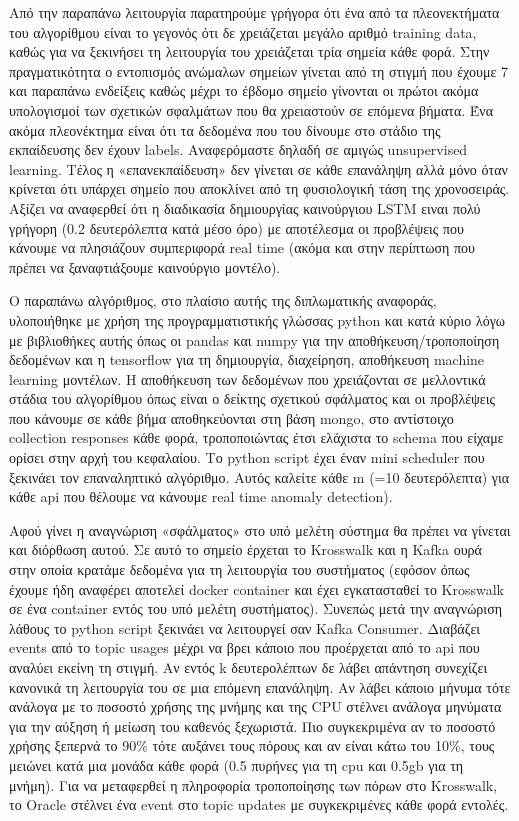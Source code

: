 Από την παραπάνω λειτουργία παρατηρούμε γρήγορα ότι ένα από τα πλεονεκτήματα του αλγορίθμου είναι το γεγονός ότι δε χρειάζεται μεγάλο αριθμό training data, καθώς για να ξεκινήσει τη λειτουργία του χρειάζεται τρία σημεία κάθε φορά. Στην πραγματικότητα ο εντοπισμός ανώμαλων σημείων γίνεται από τη στιγμή που έχουμε 7 και παραπάνω ενδείξεις καθώς μέχρι το έβδομο σημείο γίνονται οι πρώτοι ακόμα υπολογισμοί των σχετικών σφαλμάτων που θα χρειαστούν σε επόμενα βήματα. Ένα ακόμα πλεονέκτημα είναι ότι τα δεδομένα που του δίνουμε στο στάδιο της εκπαίδευσης δεν έχουν labels. Αναφερόμαστε δηλαδή σε αμιγώς unsupervised learning. Τέλος η «επανεκπαίδευση» δεν γίνεται σε κάθε επανάληψη αλλά μόνο όταν κρίνεται ότι υπάρχει σημείο που αποκλίνει από τη φυσιολογική τάση της χρονοσειράς. Αξίζει να αναφερθεί ότι η διαδικασία δημιουργίας καινούργιου LSTM ειναι πολύ γρήγορη (0.2 δευτερόλεπτα κατά μέσο όρο) με αποτέλεσμα οι προβλέψεις που κάνουμε να πλησιάζουν συμπεριφορά real time (ακόμα και στην περίπτωση που πρέπει να ξαναφτιάξουμε καινούργιο μοντέλο).

Ο παραπάνω αλγόριθμος, στο πλαίσιο αυτής της διπλωματικής αναφοράς, υλοποιήθηκε με χρήση της προγραμματιστικής γλώσσας python και κατά κύριο λόγω με βιβλιοθήκες αυτής όπως οι pandas και numpy για την αποθήκευση/τροποποίηση δεδομένων και η tensorflow για τη δημιουργία, διαχείρηση, αποθήκευση machine learning μοντέλων. Η αποθήκευση των δεδομένων που χρειάζονται σε μελλοντικά στάδια του αλγορίθμου όπως είναι ο δείκτης σχετικού σφάλματος και οι προβλέψεις που κάνουμε σε κάθε βήμα αποθηκεύονται στη βάση mongo, στο αντίστοιχο collection responses κάθε φορά, τροποποιώντας έτσι ελάχιστα το schema που είχαμε ορίσει στην αρχή του κεφαλαίου. Το python script έχει έναν mini scheduler που ξεκινάει τον επαναληπτικό αλγόριθμο. Αυτός καλείτε κάθε m (=10 δευτερόλεπτα) για κάθε api που θέλουμε να κάνουμε real time anomaly detection).

Αφού γίνει η αναγνώριση «σφάλματος» στο υπό μελέτη σύστημα θα πρέπει να γίνεται και διόρθωση αυτού. Σε αυτό το σημείο έρχεται το Krosswalk και η Kafka ουρά στην οποία κρατάμε δεδομένα για τη λειτουργία του συστήματος (εφόσον όπως έχουμε ήδη αναφέρει αποτελεί docker container και έχει εγκατασταθεί το Krosswalk σε ένα container εντός του υπό μελέτη συστήματος). Συνεπώς μετά την αναγνώριση λάθους το python script ξεκινάει να λειτουργεί σαν Kafka Consumer. Διαβάζει events από το topic usages μέχρι να βρει κάποιο που προέρχεται από το api που αναλύει εκείνη τη στιγμή. Αν εντός k δευτερολέπτων δε λάβει απάντηση συνεχίζει κανονικά τη λειτουργία του σε μια επόμενη επανάληψη. Αν λάβει κάποιο μήνυμα τότε ανάλογα με το ποσοστό χρήσης της μνήμης και της CPU στέλνει ανάλογα μηνύματα για την αύξηση ή μείωση του καθενός ξεχωριστά. Πιο συγκεκριμένα αν το ποσοστό χρήσης ξεπερνά το 90\% τότε αυξάνει τους πόρους και αν είναι κάτω του 10\%, τους μειώνει κατά μια μονάδα κάθε φορά (0.5 πυρήνες για τη cpu και 0.5gb για τη μνήμη). Για να μεταφερθεί η πληροφορία τροποποίησης των πόρων στο Krosswalk, το Oracle στέλνει ένα event στο topic updates με συγκεκριμένες κάθε φορά εντολές.

